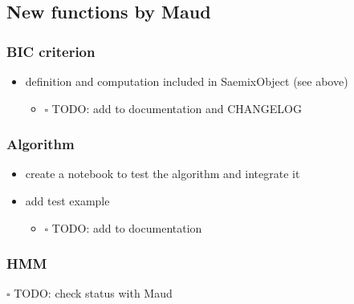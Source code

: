 \documentclass[
]{article}
\providecommand{\tightlist}{%
  \setlength{\itemsep}{0pt}\setlength{\parskip}{0pt}}
\begin{document}
\hypertarget{new-functions-by-maud}{%
\subsection{New functions by Maud}\label{new-functions-by-maud}}

\hypertarget{bic-criterion}{%
\subsubsection{BIC criterion}\label{bic-criterion}}

\begin{itemize}
\tightlist
\item
  definition and computation included in SaemixObject (see above)

  \begin{itemize}
  \tightlist
  \item
    \(\square\) TODO: add to documentation and CHANGELOG
  \end{itemize}
\end{itemize}

\hypertarget{algorithm}{%
\subsubsection{Algorithm}\label{algorithm}}

\begin{itemize}
\tightlist
\item
  create a notebook to test the algorithm and integrate it
\item
  add test example

  \begin{itemize}
  \tightlist
  \item
    \(\square\) TODO: add to documentation
  \end{itemize}
\end{itemize}

\hypertarget{hmm}{%
\subsubsection{HMM}\label{hmm}}

\(\square\) TODO: check status with Maud
\end{document}
